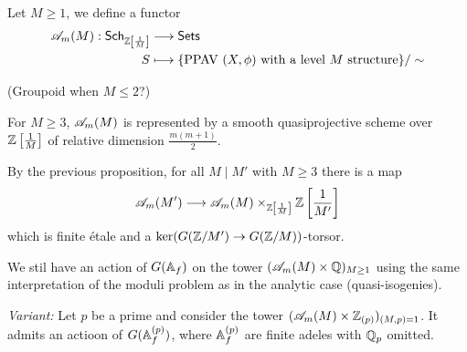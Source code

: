 \begin{definition}
	Let $M\ge 1$, we define a functor
	\begin{align*}
		\mathscr{A}_m(M): \mathsf{Sch}_{\mathbb Z\left[ \frac{1}{M} \right] } &\longrightarrow \mathsf{Sets} \\
		S &\longmapsto \{\text{PPAV }(X,\phi)\text{ with a level }M\text{ structure}\} /\sim
	\end{align*}
\end{definition}
(Groupoid when $M\le 2$?)
\begin{theorem}[Mumford]
	For $M\ge 3$, $\mathscr{A}_m(M)$ is represented by a smooth quasiprojective scheme over $\mathbb Z\left[ \frac{1}{M} \right] $ of relative dimension $\frac{m(m+1)}{2}$.
\end{theorem}
By the previous proposition, for all $M \mid M'$ with $M\ge 3$ there is a map
\[
\CA_m(M') \to \CA_m(M) \times_{\Z\left[ \frac{1}{M} \right] }\Z\left[ \frac{1}{M'} \right] 
\] 
which is finite \'etale and a $\ker(G(\Z /M')\to G(\Z /M))$-torsor.

We stil have an action of $G(\mathbb{A}_f)$ on the tower $(\mathscr{A}_m(M)\times \mathbb Q)_{M\ge 1}$ using the same interpretation of the moduli problem as in the analytic case (quasi-isogenies).

\emph{Variant:} Let $p$ be a prime and consider the tower $(\mathscr{A}_m(M)\times \mathbb Z_{(p)})_{(M,p)=1}$. It admits an actioon of $G(\mathbb{A}_f^{(p)})$, where $\mathbb{A}_f^{(p)}$ are finite adeles with $\mathbb Q_p$ omitted.

